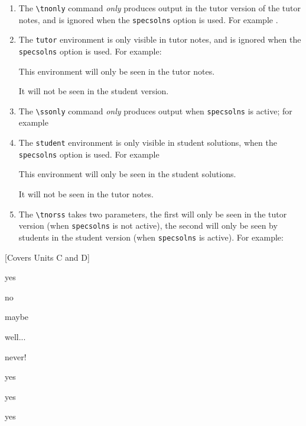 \documentclass{outn}
\begin{document}
\begin{enumerate}
  \item The \verb|\tnonly| command \emph{only} produces output in the tutor version of the tutor notes, 
    and is ignored when the \verb|specsolns| option is used. For example%
    .
  \item The \verb|tutor| environment is only visible in tutor notes, 
    and is ignored when the \verb|specsolns| option is used. For example:

    \begin{tutor}
      This environment will only be seen in the tutor notes.

      It will not be seen in the student version.
    \end{tutor}
    \tnpagebreak
  \item The \verb|\ssonly| command \emph{only} produces output when \verb|specsolns| is active; for example 
  \item The \verb|student| environment is only visible in student solutions, 
    when the \verb|specsolns| option is used. For example

    \begin{student}
      This environment will only be seen in the student solutions.

      It will not be seen in the tutor notes.
    \end{student}
    \sspagebreak
  \item The \verb|\tnorss| takes two parameters, the first will only be seen in the tutor version (when \verb|specsolns|
    is not active), the second will only be seen by students in the student version (when \verb|specsolns| is active).
    For example: 
\end{enumerate}

[Covers Units C and D]


\begin{inlineoptions}{5} %
\item yes
\item no
\item maybe
\item well...
\item never!
\item yes
\item yes
\item yes
\noitem %
\noitem
\end{inlineoptions}
\end{document}
